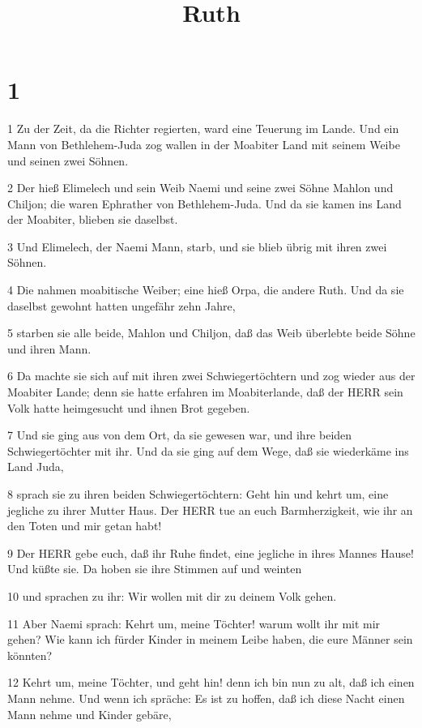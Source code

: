 

\title{Ruth}


\chapter{1}

\par 1 Zu der Zeit, da die Richter regierten, ward eine Teuerung im Lande. Und ein Mann von Bethlehem-Juda zog wallen in der Moabiter Land mit seinem Weibe und seinen zwei Söhnen.
\par 2 Der hieß Elimelech und sein Weib Naemi und seine zwei Söhne Mahlon und Chiljon; die waren Ephrather von Bethlehem-Juda. Und da sie kamen ins Land der Moabiter, blieben sie daselbst.
\par 3 Und Elimelech, der Naemi Mann, starb, und sie blieb übrig mit ihren zwei Söhnen.
\par 4 Die nahmen moabitische Weiber; eine hieß Orpa, die andere Ruth. Und da sie daselbst gewohnt hatten ungefähr zehn Jahre,
\par 5 starben sie alle beide, Mahlon und Chiljon, daß das Weib überlebte beide Söhne und ihren Mann.
\par 6 Da machte sie sich auf mit ihren zwei Schwiegertöchtern und zog wieder aus der Moabiter Lande; denn sie hatte erfahren im Moabiterlande, daß der HERR sein Volk hatte heimgesucht und ihnen Brot gegeben.
\par 7 Und sie ging aus von dem Ort, da sie gewesen war, und ihre beiden Schwiegertöchter mit ihr. Und da sie ging auf dem Wege, daß sie wiederkäme ins Land Juda,
\par 8 sprach sie zu ihren beiden Schwiegertöchtern: Geht hin und kehrt um, eine jegliche zu ihrer Mutter Haus. Der HERR tue an euch Barmherzigkeit, wie ihr an den Toten und mir getan habt!
\par 9 Der HERR gebe euch, daß ihr Ruhe findet, eine jegliche in ihres Mannes Hause! Und küßte sie. Da hoben sie ihre Stimmen auf und weinten
\par 10 und sprachen zu ihr: Wir wollen mit dir zu deinem Volk gehen.
\par 11 Aber Naemi sprach: Kehrt um, meine Töchter! warum wollt ihr mit mir gehen? Wie kann ich fürder Kinder in meinem Leibe haben, die eure Männer sein könnten?
\par 12 Kehrt um, meine Töchter, und geht hin! denn ich bin nun zu alt, daß ich einen Mann nehme. Und wenn ich spräche: Es ist zu hoffen, daß ich diese Nacht einen Mann nehme und Kinder gebäre,
